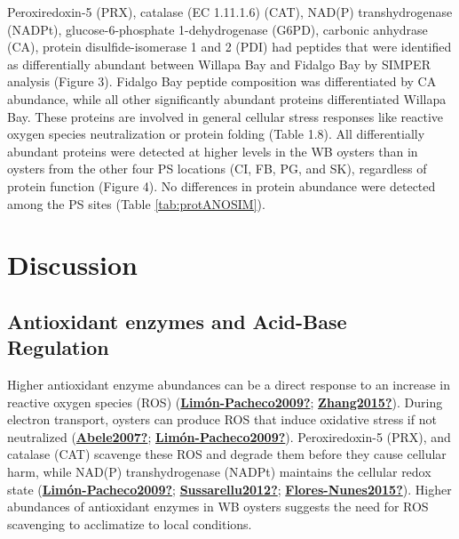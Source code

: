 \documentclass [11pt, proquest] {uwthesis}[2015/03/03]
\begin{document}
Peroxiredoxin-5 (PRX), catalase (EC 1.11.1.6) (CAT), NAD(P) transhydrogenase (NADPt), glucose-6-phosphate 1-dehydrogenase (G6PD), carbonic anhydrase (CA), protein disulfide-isomerase 1 and 2 (PDI) had peptides that were identified as differentially abundant between Willapa Bay and Fidalgo Bay by SIMPER analysis (Figure 3). Fidalgo Bay peptide composition was differentiated by CA abundance, while all other significantly abundant proteins differentiated Willapa Bay. These proteins are involved in general cellular stress responses like reactive oxygen species neutralization or protein folding (Table 1.8). All differentially abundant proteins were detected at higher levels in the WB oysters than in oysters from the other four PS locations (CI, FB, PG, and SK), regardless of protein function (Figure 4). No differences in protein abundance were detected among the PS sites (Table \ref{tab:protANOSIM}).

\hypertarget{discussion}{%
\section{Discussion}\label{discussion}}

\hypertarget{antioxidant-enzymes-and-acid-base-regulation}{%
\subsection{Antioxidant enzymes and Acid-Base Regulation}\label{antioxidant-enzymes-and-acid-base-regulation}}

Higher antioxidant enzyme abundances can be a direct response to an increase in reactive oxygen species (ROS) (\protect\hyperlink{ref-Limuxf3n-Pacheco2009}{\textbf{Limón-Pacheco2009?}}; \protect\hyperlink{ref-Zhang2015}{\textbf{Zhang2015?}}). During electron transport, oysters can produce ROS that induce oxidative stress if not neutralized (\protect\hyperlink{ref-Abele2007}{\textbf{Abele2007?}}; \protect\hyperlink{ref-Limuxf3n-Pacheco2009}{\textbf{Limón-Pacheco2009?}}). Peroxiredoxin-5 (PRX), and catalase (CAT) scavenge these ROS and degrade them before they cause cellular harm, while NAD(P) transhydrogenase (NADPt) maintains the cellular redox state (\protect\hyperlink{ref-Limuxf3n-Pacheco2009}{\textbf{Limón-Pacheco2009?}}; \protect\hyperlink{ref-Sussarellu2012}{\textbf{Sussarellu2012?}}; \protect\hyperlink{ref-Flores-Nunes2015}{\textbf{Flores-Nunes2015?}}). Higher abundances of antioxidant enzymes in WB oysters suggests the need for ROS scavenging to acclimatize to local conditions.
\end{document}
